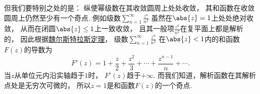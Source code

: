 但我们要特别之处的是：
纵使幂级数在其收敛圆周上处处收敛，
其和函数在收敛圆周上仍然至少有一个奇点.
例如级数\(\sum_{n=1}^\infty \frac{z^n}{n^2}\)
虽然在\(\abs{z}=1\)上处处绝对收敛，
从而在闭圆\(\abs{z}\leq1\)上一致收敛，
且其一般项\(\frac{z^n}{n^2}\)在复平面上都是解析的，
因此根据\hyperref[theorem:解析函数的级数表示.魏尔斯特拉斯定理]{魏尔斯特拉斯定理}，
级数\(\sum_{n=1}^\infty \frac{z^n}{n^2}\)
在\(\abs{z}<1\)内的和函数\(F(z)\)的导数为\begin{equation*}
	F'(z) = 1 + \frac{z}{2} + \frac{z^2}{3} + \dotsb + \frac{z^{n-1}}{n} + \dotsb.
\end{equation*}
当\(z\)从单位元内沿实轴趋于\(1\)时，
\(F'(z)\)趋于\(+\infty\).
而我们知道，解析函数在其解析点处是无穷次可微的，
所以\(z=1\)是和函数\(F(z)\)的一个奇点.
